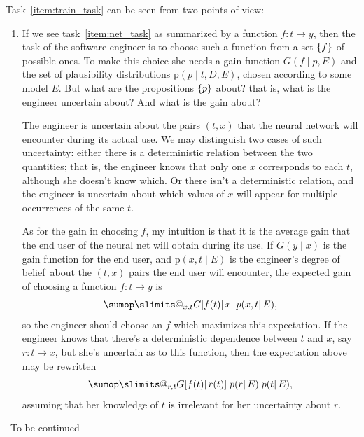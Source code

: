 \documentclass[\ifafour a4paper,12pt,\else a5paper,10pt,\fi%
onecolumn,oneside,article,%
british%
]{memoir}
\makeatletter
\theoremstyle{remark}
\theoremstyle{innote}
\def\sum{\DOTSI\sumop\slimits@}
\DeclarePairedDelimiter\set{\{}{\}}
\newcommand*{\pf}{\mathrm{p}}%
\renewcommand*{\|}{\mathpunct{|}}
\newcommand*{\puzzle}{\maltese}
\newcommand{\mynote}[1]{ {\color{notecolour}\puzzle\ #1}}
\newcommand*{\dob}{degree of belief}
\newcommand*{\yp}{p}
\newcommand*{\yg}{G}
\newcommand*{\yD}{D}
\newcommand*{\yE}{E}
\makeatother
\begin{document}
Task~\ref{item:train_task} can be seen from two points of view:
\begin{enumerate}[wide,label=(\arabic*)]
\item If we see task~\ref{item:net_task} as summarized by a function
  $f\colon t\mapsto y$, then the task of the software engineer is to choose
  such a function from a set $\set{f}$ of possible ones. To make this
  choice she needs a gain function $\yg(f \| \yp, \yE)$ and the set of
  plausibility distributions $\pf(\yp \| t,\yD, \yE)$, chosen according to
  some model $\yE$. But what are the propositions $\set{\yp}$ about? that
  is, what is the engineer uncertain about? And what is the gain about?

  The engineer is uncertain about the pairs $(t,x)$ that the neural network
  will encounter during its actual use. We may distinguish two cases of
  such uncertainty: either there is a deterministic relation between the
  two quantities; that is, the engineer knows that only one $x$ corresponds
  to each $t$, although she doesn't know which. Or there isn't a
  deterministic relation, and the engineer is uncertain about which values
  of $x$ will appear for multiple occurrences of the same $t$.

  As for the gain in choosing $f$, my intuition is that it is the average
  gain that the end user of the neural net will obtain during its use. If
  $\yg(y \|x)$ is the gain function for the end user, and
  $\pf(x,t \| \yE)$ is the engineer's \dob\ about the $(t,x)$ pairs the end
  user will encounter, the expected gain of choosing a function $f\colon t
  \mapsto y$ is
  \begin{equation}
    \label{eq:engineer_gain}
    \sum_{x,t} \yg[f(t) \|x]\;\yp(x,t \| \yE),
  \end{equation}
  so the engineer should choose an $f$ which maximizes this expectation. If
  the engineer knows that there's a deterministic dependence between $t$
  and $x$, say $r\colon t \mapsto x$, but she's uncertain as to this
  function, then the expectation above may be rewritten
  \begin{equation}
    \label{eq:engineer_gain_deterministic}
    \sum_{r,t} \yg[f(t) \| r(t)]\;\yp(r \| \yE)\;\yp(t \| \yE),
  \end{equation}
  assuming that her knowledge of $t$ is irrelevant for her uncertainty
  about $r$.
\end{enumerate}

\mynote{To be continued}
\end{document}
